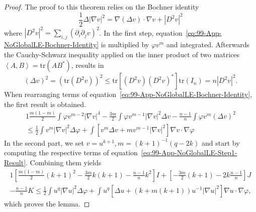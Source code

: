 \begin{proof}
	The proof to this theorem relies on the Bochner identity
	\begin{equation}
		\frac{1}{2}\Delta |\nabla v|^2 = \nabla (\Delta v)\cdot \nabla v + |D^{2}v|^2
		\label{eq:99-App-NoGlobalLE-Bochner-Identity}
	\end{equation}
	where $|D^2 v|^2=\sum\limits_{i,j}(\partial_i\partial_j v)^2$.
	In the first step, equation~\eqref{eq:99-App-NoGlobalLE-Bochner-Identity} is multiplied by $\varphi v^m$ and integrated.
	Afterwards the Cauchy-Schwarz inequality applied on the inner product of two matrices $\left<A,B\right>=\mathrm{tr}(AB^*)$, results in
	\begin{equation}
		(\Delta v)^2 = (\mathrm{tr}(D^2 v))^2 \leq \mathrm{tr}\left[(D^2 v)(D^2 v)^*\right]\mathrm{tr}(I_n)=n|D^2 v|^2.
		\label{eq:99-App-NoGlobalLE-Step1-Result}
	\end{equation}
	When rearranging terms of equation~\eqref{eq:99-App-NoGlobalLE-Bochner-Identity}, the first result is obtained.
	\begin{alignat}{1}
		\frac{m(1-m)}{2} \int \varphi v^{m-2}|\nabla v|^{4}-\frac{3 m}{2} \int \varphi v^{m-1}|\nabla v|^{2} \Delta v-\frac{n-1}{n} \int \varphi v^{m}(\Delta v)^{2} \\
		\leq \frac{1}{2} \int v^{m}|\nabla v|^{2} \Delta \varphi+\int\left[v^{m} \Delta v+m v^{m-1}|\nabla v|^{2}\right] \nabla v \cdot \nabla \varphi
	\end{alignat}
	In the second part, we set $v=u^{k+1},m=(k+1)^{-1}(q-2k)$ and start by computing the respective terms of equation~\eqref{eq:99-App-NoGlobalLE-Step1-Result}.
	Combining them yields
	\begin{alignat}{1}
			{\left[\frac{m(1-m)}{2}(k+1)^{2}-\frac{3 m}{2} k(k+1)-\frac{n-1}{n} k^{2}\right] I+\left[-\frac{3 m}{2}(k+1)-2 k \frac{n-1}{n}\right] J} \\
			-\frac{n-1}{n} K \leq \frac{1}{2} \int u^{q}|\nabla u|^{2} \Delta \varphi+\int u^{q}\left[\Delta u+(k+m(k+1)) u^{-1}|\nabla u|^{2}\right] \nabla u \cdot \nabla \varphi,
	\end{alignat}
	which proves the lemma.
\end{proof}
